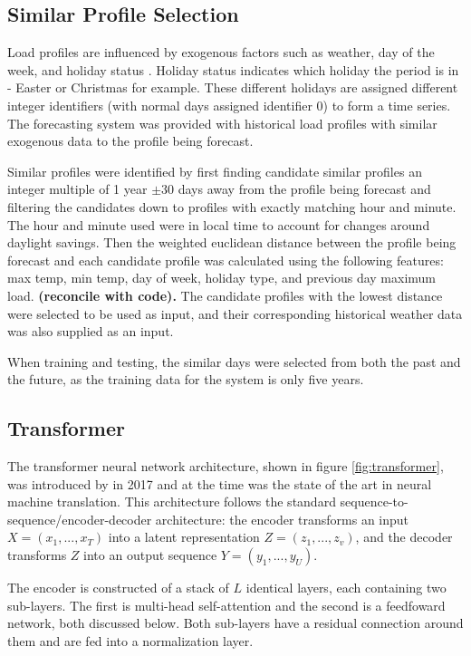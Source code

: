 \documentclass[conference]{IEEEtran}
\begin{document}
\subsection{Similar Profile Selection}
Load profiles are influenced by exogenous factors such as weather, day of the week, and holiday status \cite{Weron2006}.
Holiday status indicates which holiday the period is in - Easter or Christmas for example.
These different holidays are assigned different integer identifiers (with normal days assigned identifier 0) to form a time series.
The forecasting system was provided with historical load profiles with similar exogenous data to the profile being forecast.
\par
Similar profiles were identified by first finding candidate similar profiles an integer multiple of 1 year $\pm$30 days away from the profile being forecast and filtering the candidates down to profiles with exactly matching hour and minute.
The hour and minute used were in local time to account for changes around daylight savings.
Then the weighted euclidean distance between the profile being forecast and each candidate profile was calculated using the following features: max temp, min temp, day of week, holiday type, and previous day maximum load. \textbf{(reconcile with code).}
The candidate profiles with the lowest distance were selected to be used as input, and their corresponding historical weather data was also supplied as an input.
\par
When training and testing, the similar days were selected from both the past and the future, as the training data for the system is only five years.
\subsection{Transformer}
The transformer neural network architecture, shown in figure \ref{fig:transformer}, was introduced by \cite{Vaswani2017} in 2017 and at the time was the state of the art in neural machine translation.
This architecture follows the standard sequence-to-sequence/encoder-decoder architecture: the encoder transforms an input $X = (x_1, ..., x_T)$ into a latent representation $Z = (z_1, ..., z_v)$, and the decoder transforms $Z$ into an output sequence $Y = (y_1, ..., y_U)$.

The encoder is constructed of a stack of $L$ identical layers, each containing two sub-layers.
The first is multi-head self-attention and the second is a feedfoward network, both discussed below.
Both sub-layers have a residual connection around them and are fed into a normalization layer.
\end{document}
